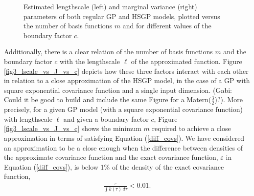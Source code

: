 \documentclass[]{interact}
\theoremstyle{plain}%
\theoremstyle{definition}
\theoremstyle{remark}
\begin{document}
\begin{figure}
\caption{Estimated lengthscale (left) and marginal variance (right) parameters of both regular GP and HSGP models, plotted versus the number of basis functions $m$ and for different values of the boundary factor $c$.}
  \label{fig5_lscale_vs_J}
\end{figure}


Additionally, there is a clear relation of the number of basis functions $m$ and the boundary factor $c$ with the lengthscale $\ell$ of the approximated function. Figure \ref{fig3_lscale_vs_J_vs_c} depicts how these three factors interact with each other in relation to 
a close approximation of the HSGP model, in the case of a GP with square exponential covariance function and a single input dimension. (Gabi: Could it be good to build and include the same Figure for a Matern($\frac{3}{2}$)?). More precisely, for a given GP model (with a square exponential covariance function) with lengthscale $\ell$ and given a boundary factor $c$, Figure \ref{fig3_lscale_vs_J_vs_c} shows the minimum $m$ required to achieve a close approximation in terms of satisfying Equation (\ref{diff_covs}). We have considered an approximation to be a close enough when the difference between densities of the approximate covariance function and the exact covariance function, $\varepsilon$ in Equation (\ref{diff_covs}), is below 1$\%$ of the density of the exact covariance function,
%
\begin{eqnarray*}
 \frac{\varepsilon}{\int k(\tau) \, d\tau} < 0.01.
\end{eqnarray*}
\end{document}
